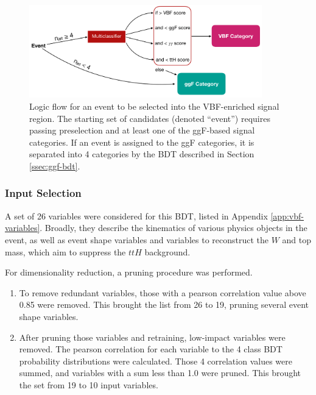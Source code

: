 \begin{figure}[htbp]
    \centering
	\includegraphics[width=0.9\textwidth]{chapters/chapter6_vbf/images/vbf_logic.png}
    \caption[Logic flow for an event to be selected into the VBF-enriched signal region]{Logic flow for an event to be selected into the VBF-enriched signal region. The starting set of candidates (denoted ``event'') requires passing preselection and at least one of the ggF-based signal categories. If an event is assigned to the ggF categories, it is separated into 4 categories by the \gls{BDT} described in Section \ref{ssec:ggf-bdt}.}
    \label{fig:vbf-logic}
\end{figure}

\subsubsection{Input Selection}
A set of 26 variables were considered for this BDT, listed in Appendix \ref{app:vbf-variables}. Broadly, they describe the kinematics of various physics objects in the event, as well as event shape variables \cite{STDM-2011-33} and variables to reconstruct the $W$ and top mass, which aim to suppress the $ttH$ background.

For dimensionality reduction, a pruning procedure was performed.
\begin{enumerate}
  \item To remove redundant variables, those with a pearson correlation value above 0.85 were removed. This brought the list from 26 to 19, pruning several event shape variables.
  \item After pruning those variables and retraining, low-impact variables were removed. The pearson correlation for each variable to the 4 class \gls{BDT} probability distributions were calculated. Those 4 correlation values were summed, and variables with a sum less than 1.0 were pruned. This brought the set from 19 to 10 input variables.
\end{enumerate}

